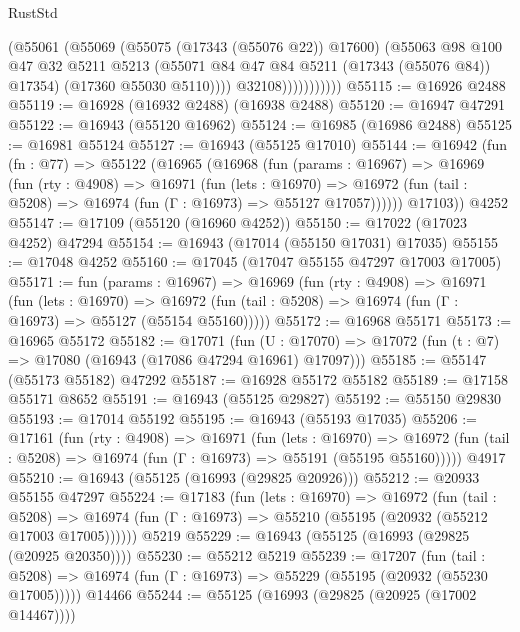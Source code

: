 \begin{lexlean}{RustStd}
\begin{coremodule}
                          (@55061
                            (@55069
                              (@55075 (@17343 (@55076 @22)) @17600)
                              (@55063
                                @98
                                @100
                                @47
                                @32
                                @5211
                                @5213
                                (@55071 @84 @47 @84 @5211 (@17343 (@55076 @84)) @17354)
                                (@17360 @55030 @5110))))
                          @32108)))))))))))
@55115 := @16926 @2488
@55119 := @16928 (@16932 @2488) (@16938 @2488)
@55120 := @16947 @47291
@55122 := @16943 (@55120 @16962)
@55124 := @16985 (@16986 @2488)
@55125 := @16981 @55124
@55127 := @16943 (@55125 @17010)
@55144 := @16942
    (fun (fn : @77) =>
    @55122
      (@16965
        (@16968
          (fun (params : @16967) =>
          @16969
            (fun (rty : @4908) =>
            @16971
              (fun (lets : @16970) =>
              @16972 (fun (tail : @5208) => @16974 (fun (Γ : @16973) => @55127 @17057))))))
        @17103))
    @4252
@55147 := @17109 (@55120 (@16960 @4252))
@55150 := @17022 (@17023 @4252) @47294
@55154 := @16943 (@17014 (@55150 @17031) @17035)
@55155 := @17048 @4252
@55160 := @17045 (@17047 @55155 @47297 @17003 @17005)
@55171 := fun (params : @16967) =>
  @16969
    (fun (rty : @4908) =>
    @16971
      (fun (lets : @16970) =>
      @16972 (fun (tail : @5208) => @16974 (fun (Γ : @16973) => @55127 (@55154 @55160)))))
@55172 := @16968 @55171
@55173 := @16965 @55172
@55182 := @17071
    (fun (U : @17070) => @17072 (fun (t : @7) => @17080 (@16943 (@17086 @47294 @16961) @17097)))
@55185 := @55147 (@55173 @55182) @47292
@55187 := @16928 @55172 @55182
@55189 := @17158 @55171 @8652
@55191 := @16943 (@55125 @29827)
@55192 := @55150 @29830
@55193 := @17014 @55192
@55195 := @16943 (@55193 @17035)
@55206 := @17161
    (fun (rty : @4908) =>
    @16971
      (fun (lets : @16970) =>
      @16972 (fun (tail : @5208) => @16974 (fun (Γ : @16973) => @55191 (@55195 @55160)))))
    @4917
@55210 := @16943 (@55125 (@16993 (@29825 @20926)))
@55212 := @20933 @55155 @47297
@55224 := @17183
    (fun (lets : @16970) =>
    @16972
      (fun (tail : @5208) =>
      @16974 (fun (Γ : @16973) => @55210 (@55195 (@20932 (@55212 @17003 @17005))))))
    @5219
@55229 := @16943 (@55125 (@16993 (@29825 (@20925 @20350))))
@55230 := @55212 @5219
@55239 := @17207
    (fun (tail : @5208) => @16974 (fun (Γ : @16973) => @55229 (@55195 (@20932 (@55230 @17005)))))
    @14466
@55244 := @55125 (@16993 (@29825 (@20925 (@17002 @14467))))

\end{coremodule}
\end{lexlean}
